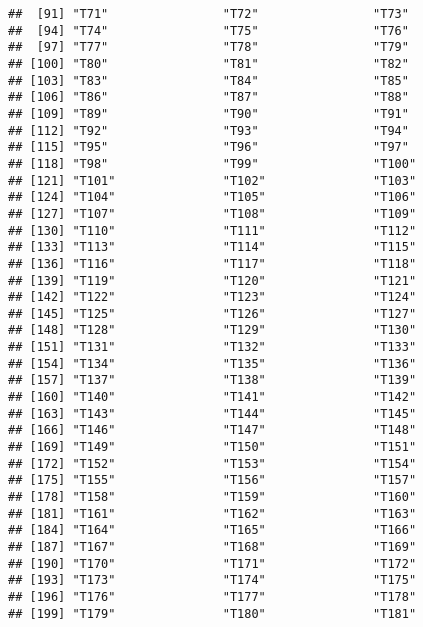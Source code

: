 \documentclass[
]{book}
\begin{document}
\begin{verbatim}
##  [91] "T71"                "T72"                "T73"               
##  [94] "T74"                "T75"                "T76"               
##  [97] "T77"                "T78"                "T79"               
## [100] "T80"                "T81"                "T82"               
## [103] "T83"                "T84"                "T85"               
## [106] "T86"                "T87"                "T88"               
## [109] "T89"                "T90"                "T91"               
## [112] "T92"                "T93"                "T94"               
## [115] "T95"                "T96"                "T97"               
## [118] "T98"                "T99"                "T100"              
## [121] "T101"               "T102"               "T103"              
## [124] "T104"               "T105"               "T106"              
## [127] "T107"               "T108"               "T109"              
## [130] "T110"               "T111"               "T112"              
## [133] "T113"               "T114"               "T115"              
## [136] "T116"               "T117"               "T118"              
## [139] "T119"               "T120"               "T121"              
## [142] "T122"               "T123"               "T124"              
## [145] "T125"               "T126"               "T127"              
## [148] "T128"               "T129"               "T130"              
## [151] "T131"               "T132"               "T133"              
## [154] "T134"               "T135"               "T136"              
## [157] "T137"               "T138"               "T139"              
## [160] "T140"               "T141"               "T142"              
## [163] "T143"               "T144"               "T145"              
## [166] "T146"               "T147"               "T148"              
## [169] "T149"               "T150"               "T151"              
## [172] "T152"               "T153"               "T154"              
## [175] "T155"               "T156"               "T157"              
## [178] "T158"               "T159"               "T160"              
## [181] "T161"               "T162"               "T163"              
## [184] "T164"               "T165"               "T166"              
## [187] "T167"               "T168"               "T169"              
## [190] "T170"               "T171"               "T172"              
## [193] "T173"               "T174"               "T175"              
## [196] "T176"               "T177"               "T178"              
## [199] "T179"               "T180"               "T181"              

\end{verbatim}
\end{document}
